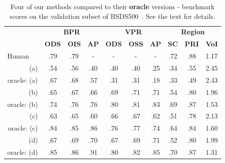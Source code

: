 \begin{table}[htbp]
\renewcommand{\arraystretch}{1.3}
\centering
\scriptsize
\begin{tabular}{l|c|c|c||c|c|c||c|c|c|}
\cline{2-10} %
\multirow{2}{*}{} & \multicolumn{3}{c||}{\textbf{BPR}} & \multicolumn{3}{c||}{\textbf{VPR}}& \multicolumn{3}{c|}{\textbf{Region}}\\
\cline{2-10}
& \textbf{ODS}  & \textbf{OIS} & \textbf{AP} %
& \textbf{ODS} & \textbf{OSS} & \textbf{AP} %
& \textbf{SC} & \textbf{PRI} & \textbf{VoI} \\
\hline
\multicolumn{1}{|l|}{Human} & .79 & .79 & - & - & - & - & .72 & .88 & 1.17 \\ %
\hline
\multicolumn{1}{|r|}{(a)} & .54 & .56 & .40 & .40 & .40 & .25 & .34 & .55 & 2.45 \\
\multicolumn{1}{|r|}{oracle: (a)} & .67 & .68 & .57 & .31 & .31 & .18 & .33 & .49 & 2.43 \\
\multicolumn{1}{|r|}{(b)} & .65 & .67 & .66 & .69 & .71 & .71 & .54 & .80 & 1.96 \\
\multicolumn{1}{|r|}{oracle: (b)} & .74 & .76 & .76 & .80 & .81 & .83 & .69 & .87 & 1.53 \\
\multicolumn{1}{|r|}{(c)} & .63 & .65 & .60 & .66 & .67 & .62 & .51 & .78 & 2.13 \\
\multicolumn{1}{|r|}{oracle: (c)} & .84 & .85 & .86 & .76 & .77 & .74 & .64 & .84 & 1.60 \\
\multicolumn{1}{|r|}{(d)} & .67 & .69 & .70 & .67 & .69 & .71 & .52 & .80 & 1.99 \\
\multicolumn{1}{|r|}{oracle: (d)} & .85 & .86 & .91 & .80 & .82 & .85 & .70 & .87 & 1.31 \\
\hline
\end{tabular}
\caption[Four of our methods compared to their oracle versions]{Four of our methods compared to their {\bf oracle} versions - benchmark scores on the validation subset of BSDS500~\cite{BSDS500resources}. See the text for details.}
\label{tab:oracle}
\end{table}

